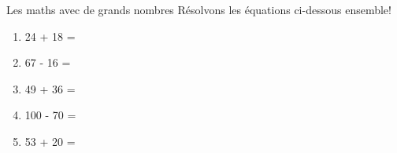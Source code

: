 \begin{frame}{Les maths avec de grands nombres}
  Résolvons les équations ci-dessous ensemble! \\
  \begin{enumerate}
    \item 24 + 18 = 
    \item 67 - 16 = 
    \item 49 + 36 = 
    \item 100 - 70 = 
    \item 53 + 20 = 
  \end{enumerate}
\end{frame}